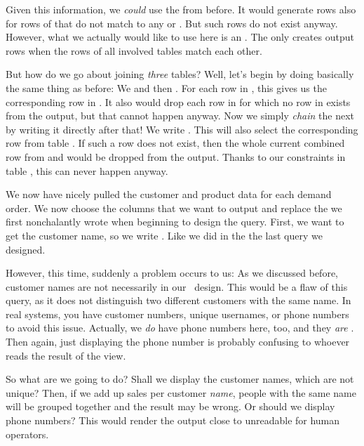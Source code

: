 Given this information, we \emph{could} use the  from before.
It would generate rows also for rows of  that do not match to any  or .
But such rows do not exist anyway.
However, what we actually would like to use here is an .
The  only creates output rows when the rows of all involved tables match each other.%
%
\begin{sloppypar}%
But how do we go about joining \emph{three} tables?
Well, let's begin by doing basically the same thing as before:
We  and then .
For each row in , this gives us the corresponding row in .
It also would drop each row in  for which no row in  exists from the output, but that cannot happen anyway.
Now we simply \emph{chain} the next  by writing it directly after that!
We write .
This will also select the corresponding row from table .
If such a row does not exist, then the whole current combined row from  and  would be dropped from the output.
Thanks to our  constraints in table , this can never happen anyway.%
\end{sloppypar}%
%
We now have nicely pulled the customer and product data for each demand order.
We now choose the columns that we want to output and replace the  we first nonchalantly wrote when beginning to design the query.
First, we want to get the customer name, so we write .
Like we did in the the last query we designed.

However, this time, suddenly a problem occurs to us:
As we discussed before, customer names are not necessarily  in our \db\ design.
This would be a flaw of this query, as it does not distinguish two different customers with the same name.
In real systems, you have customer numbers, unique usernames, or phone numbers to avoid this issue.
Actually, we \emph{do} have phone numbers here, too, and they \emph{are} .
Then again, just displaying the phone number is probably confusing to whoever reads the result of the view.

So what are we going to do?
Shall we display the customer names, which are not unique?
Then, if we add up sales per customer \emph{name}, people with the same name will be grouped together and the result may be wrong.
Or should we display phone numbers?
This would render the output close to unreadable for human operators.


